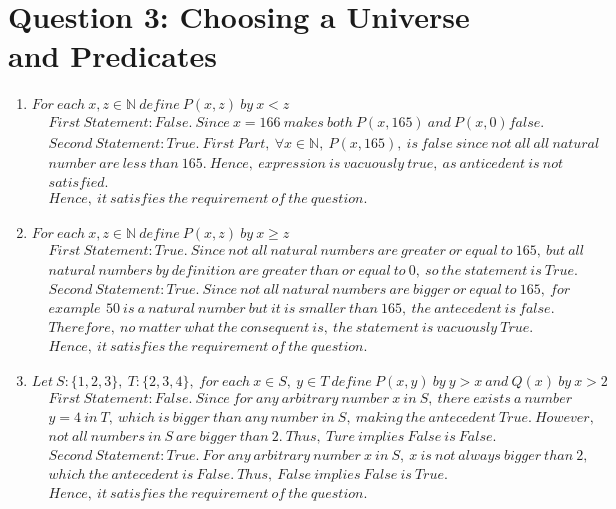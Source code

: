 \documentclass[12pt]{article}
\begin{document}
\section{Question 3: Choosing a Universe and Predicates}
\begin{enumerate}[label=(\alph*)]
	\item $For\ each\ x, z \in \mathbb{N}\ define\ P(x, z)\ by\ x<z$
\begin{align*}
	&First\ Statement: False. \ Since\ x=166\ makes\ both\ P(x, 165)\ and\ P(x, 0) false.\\
	&Second\ Statement: True.\ First\ Part,\ \forall x \in \mathbb{N},\ P(x, 165),\ is\ false\ since\ not\ all\ all\ natural\\
	&number\ are\ less\ than\ 165.\ Hence,\ expression\ is\ vacuously\ true,\ as\ anticedent\ is\ not\\ 
	&satisfied.\\
	&Hence,\ it\ satisfies\ the\ requirement\ of\ the\ question.
\end{align*}
	\item $For\ each\ x, z \in \mathbb{N}\ define\ P(x, z)\ by\  x\geq z$
\begin{align*}
	&First\ Statement: True. \ Since\ not\ all\ natural\ numbers\ are\ greater\ or\ equal\ to\ 165,\ but\ all\\
	&natural\ numbers\ by\ definition\ are\ greater\ than\ or\ equal\ to\ 0,\ so\ the\ statement\ is\ True.\\
	&Second\ Statement: True.\ Since\ not\ all\ natural\ numbers\ are\ bigger\ or\ equal\ to\ 165,\ for\\ 
	&example\,\ 50\ is\ a\ natural\ number\ but\ it\ is\ smaller\ than\ 165,\ the\ antecedent\ is\ false.\\
	&Therefore,\ no\ matter\ what\ the\ consequent\ is,\ the\ statement\ is\ vacuously\ True. \\
	&Hence,\ it\ satisfies\ the\ requirement\ of\ the \ question.
\end{align*}
	\item $Let\ S:\{1, 2, 3\},\ T:\{2, 3, 4\},\ for\ each\ x\in S,\ y \in T\ define\ P(x, y)\ by\ y>x\ and\ Q(x)\ by\ x>2$
\begin{align*}
	&First\ Statement: False.\ Since\ for\ any\ arbitrary\ number\ x\ in\ S,\ there\  exists\ a\ number\\
	&y=4\ in\ T,\ which\ is\ bigger\ than\ any\ number\ in\ S,\ making\ the\ antecedent\ True.\ However,\\
	&not\ all\ numbers\ in\ S\ are\ bigger\ than\ 2.\ Thus,\ Ture\ implies\ False\ is\ False.\\
	&Second\ Statement: True.\ For\ any\ arbitrary\ number\ x\ in\ S,\ x\ is\ not\ always\ bigger\ than\ 2,\\
	&which\ the\ antecedent\ is\ False.\ Thus,\ False\ implies\ False\ is\ True.\\
	&Hence,\ it\ satisfies\ the\ requirement\ of \ the\ question.
\end{align*}
\end{enumerate}
\newpage
\end{document}
